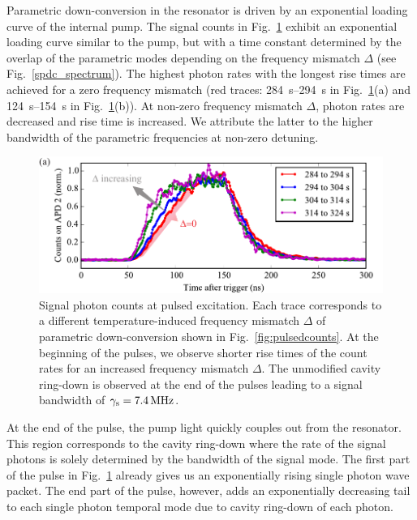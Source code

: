 \documentclass[aps,pra,showpacs,reprint,onecolumn,notitlepage]{revtex4-1}
\newcommand{\tx}[1]{\textnormal{#1}}
\begin{document}
Parametric down-conversion in the resonator is driven by an exponential loading curve of the internal pump. The signal counts in Fig.~\ref{fig:pulsedcountsnano} exhibit an exponential loading curve similar to the pump, but with a time constant determined by the overlap of the parametric modes depending on the frequency mismatch $\Delta$ (see Fig.~\ref{spdc_spectrum}). The highest photon rates with the longest rise times are achieved for a zero frequency mismatch (red traces: \SIrange[range-units = single]{284}{294}{\s} in Fig.~\ref{fig:pulsedcountsnano}(a) and \SIrange[range-units = single]{124}{154}{\s} in Fig.~\ref{fig:pulsedcountsnano}(b)). At non-zero frequency mismatch $\Delta$, photon rates are decreased and rise time is increased. We attribute the latter to the higher bandwidth of the parametric frequencies at non-zero detuning.
\begin{figure}[htb]
	\centering
	\includegraphics[scale=0.8]{pictures/exp_WGMR_detuning/SPDC_detuning_pulses_1.pdf} 
	\caption{Signal photon counts at pulsed excitation. Each trace corresponds to a different temperature-induced frequency mismatch $\Delta$ of parametric down-conversion shown in Fig.~\ref{fig:pulsedcounts}. At the beginning of the pulses, we observe shorter rise times of the count rates for an increased frequency mismatch $\Delta$. The unmodified cavity ring-down is observed at the end of the pulses leading to a signal bandwidth of ${\gamma_\tx{s}=\SI{7.4}{\MHz}}$.}
	\label{fig:pulsedcountsnano}
\end{figure}

At the end of the pulse, the pump light quickly couples out from the resonator. This region corresponds to the cavity ring-down where the rate of the signal photons is solely determined by the bandwidth of the signal mode. The first part of the pulse in Fig.~\ref{fig:pulsedcountsnano} already gives us an exponentially rising single photon wave packet. The end part of the pulse, however, adds an exponentially decreasing tail to each single photon temporal mode due to cavity ring-down of each photon.
\end{document}
